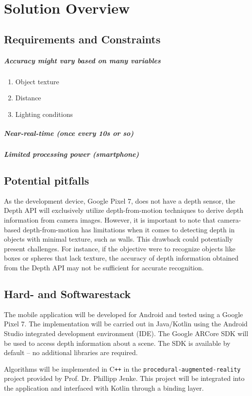 \chapter{Solution Overview}
\section{Requirements and Constraints}

\paragraph{Accuracy might vary based on many variables}

\begin{enumerate}
    \item Object texture
    \item Distance
    \item Lighting conditions
\end{enumerate}

\paragraph{Near-real-time (once every 10s or so)}

\paragraph{Limited processing power (smartphone)}


\section{Potential pitfalls}
As the development device, Google Pixel 7, does not have a depth sensor,
the Depth API will exclusively utilize depth-from-motion techniques to derive depth information from camera images.
However, it is important to note that camera-based depth-from-motion has limitations
when it comes to detecting depth in objects with minimal texture, such as walls.
This drawback could potentially present challenges.
For instance, if the objective were to recognize objects like boxes or spheres that lack texture,
the accuracy of depth information obtained from the Depth API may not be sufficient for accurate recognition. \parencite{google_llc_arcore_doc}

\section{Hard- and Softwarestack}

The mobile application will be developed for Android and tested using a Google Pixel 7.
The implementation will be carried out in Java/Kotlin using the Android Studio integrated development environment (IDE).
The Google ARCore SDK will be used to access depth information about a scene.
The SDK is available by default -- no additional libraries are required.

Algorithms will be implemented in C\texttt{++} in the \texttt{procedural-augmented-reality} project provided by Prof. Dr. Phillipp Jenke.
This project will be integrated into the application and interfaced with Kotlin through a binding layer.



